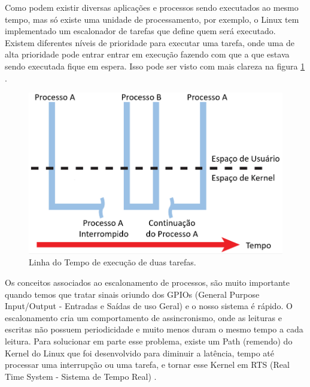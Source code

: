 Como podem existir diversas aplicações e processos sendo executados ao mesmo tempo, mas só existe uma unidade de processamento, por exemplo, o Linux tem implementado um escalonador de tarefas que define quem será executado. Existem diferentes níveis de prioridade para executar uma tarefa, onde uma de alta prioridade pode entrar entrar em execução fazendo com que a que estava sendo executada fique em espera. Isso pode ser visto com mais clareza na figura \ref{fig:escalonador_hallinan_p469} \cite{Tobergte2013}.

\begin{figure}[H]
  \caption{Linha do Tempo de execução de duas tarefas.}
  \begin{center}
      \includegraphics[scale=0.45]{img/escalonador_hallinan_p469}
  \end{center}
  \label{fig:escalonador_hallinan_p469}
\end{figure}

Os conceitos associados ao escalonamento de processos, são muito importante quando temos que tratar sinais oriundo dos GPIOs (General Purpose Input/Output - Entradas e Saídas de uso Geral) e o nosso sistema é rápido. O escalonamento cria um comportamento de assincronismo, onde as leituras e escritas não possuem periodicidade e muito menos duram o mesmo tempo a cada leitura. Para solucionar em parte esse problema, existe um Path (remendo) do Kernel do Linux que foi desenvolvido para diminuir a latência, tempo até processar uma interrupção ou uma tarefa, e tornar esse Kernel em RTS (Real Time System - Sistema de Tempo Real) \cite{Tobergte2013}.



